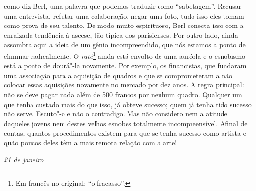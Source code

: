 como diz Berl, uma palavra que podemos traduzir como ``sabotagem''. Recusar uma entrevista,
refutar uma colaboração, negar uma foto, tudo isso eles tomam como prova
de seu talento. De modo muito espirituoso, Berl conecta isso com a
enraizada tendência à ascese, tão típica dos parisienses. Por outro lado,
ainda assombra aqui a ideia de um gênio incompreendido, que nós estamos a ponto de eliminar
radicalmente. O \emph{raté}\footnote{Em francês no original:
  ``o fracasso''. \versal{[N.~T.]}} ainda está envolto de
uma auréola e o esnobismo está a ponto de dourá"-la novamente. Por
exemplo, os financistas, que fundaram uma associação para a aquisição de
quadros e que se comprometeram a não colocar essas aquisições novamente
no mercado por dez anos. A regra principal: não se deve pagar nada além
de 500 francos por nenhum quadro. Qualquer um que tenha custado mais do
que isso, já obteve sucesso; quem já tenha tido sucesso não serve.
Escuto"-o e não o contradigo. Mas não considero nem a atitude daqueles jovens
nem destes velhos esnobes totalmente incompreensível. Afinal de contas,
quantos procedimentos existem para que se tenha sucesso como artista e
quão poucos deles têm a mais remota relação com a arte!


\begin{flushright}
\emph{21 de janeiro}
\end{flushright}

